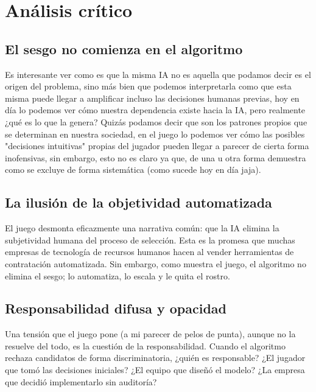 \documentclass[12pt, a4paper]{article}
\begin{document}
\section{Análisis crítico}

\subsection{El sesgo no comienza en el algoritmo}

Es interesante ver como es que la misma IA no es aquella que podamos decir es el origen del problema, sino más bien que podemos interpretarla como que esta misma puede llegar
a amplificar incluso las decisiones humanas previas, hoy en día lo podemos ver cómo nuestra dependencia existe hacia la IA, pero realmente ¿qué es lo que la genera? Quizás podamos decir que son los patrones
propios que se determinan en nuestra sociedad, en el juego lo podemos ver cómo las posibles "decisiones intuitivas" propias del jugador pueden llegar a parecer de cierta forma inofensivas, sin embargo, esto no es claro ya que,
de una u otra forma demuestra como se excluye de forma sistemática (como sucede hoy en día jaja).

\subsection{La ilusión de la objetividad automatizada}

El juego desmonta eficazmente una narrativa común: que la IA elimina la subjetividad humana del proceso de selección. Esta es la promesa que muchas empresas de tecnología de recursos humanos hacen al vender herramientas de contratación automatizada. Sin embargo, como muestra el juego, el algoritmo no elimina el sesgo; lo automatiza, lo escala y le quita el rostro.

\subsection{Responsabilidad difusa y opacidad}

Una tensión que el juego pone (a mi parecer de pelos de punta), aunque no la resuelve del todo, es la cuestión de la responsabilidad. Cuando el algoritmo rechaza candidatos de forma discriminatoria, ¿quién es responsable? ¿El jugador que tomó las decisiones iniciales? ¿El equipo que diseñó el modelo? ¿La empresa que decidió implementarlo sin auditoría?
\end{document}
